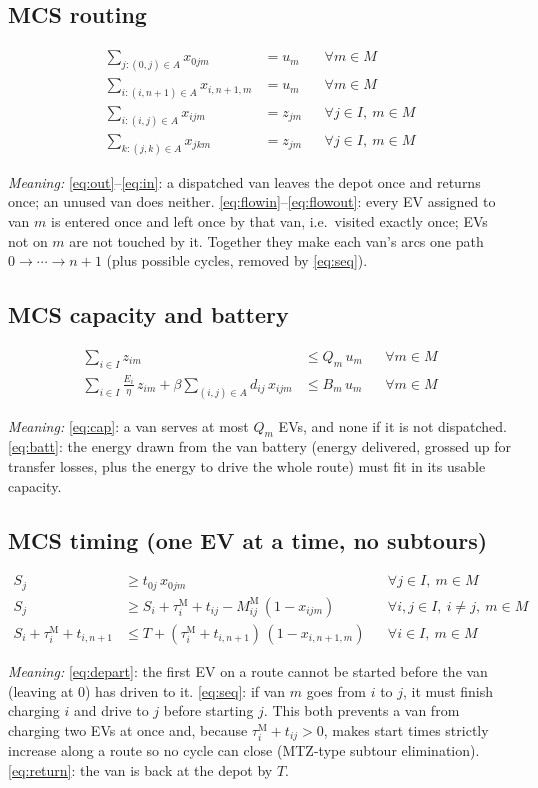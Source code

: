 \documentclass[12pt,a4paper]{article}
\newcommand{\mdesc}[1]{\par{\textit{Meaning:} #1}\par}
\begin{document}
\subsection{MCS routing}
\begin{align}
\sum_{j:(0,j)\in A}x_{0jm} &= u_m && \forall m\in M \label{eq:out}\\
\sum_{i:(i,n+1)\in A}x_{i,n+1,m} &= u_m && \forall m\in M \label{eq:in}\\
\sum_{i:(i,j)\in A}x_{ijm} &= z_{jm} && \forall j\in I,\ m\in M \label{eq:flowin}\\
\sum_{k:(j,k)\in A}x_{jkm} &= z_{jm} && \forall j\in I,\ m\in M \label{eq:flowout}
\end{align}
\mdesc{\eqref{eq:out}--\eqref{eq:in}: a dispatched van leaves the depot once and returns once; an unused van does neither. \eqref{eq:flowin}--\eqref{eq:flowout}: every EV assigned to van $m$ is entered once and left once by that van, i.e.\ visited exactly once; EVs not on $m$ are not touched by it. Together they make each van's arcs one path $0\to\cdots\to n+1$ (plus possible cycles, removed by \eqref{eq:seq}).}

\subsection{MCS capacity and battery}
\begin{align}
\sum_{i\in I}z_{im} &\le Q_m\,u_m && \forall m\in M \label{eq:cap}\\
\sum_{i\in I}\frac{E_i}{\eta}\,z_{im}+\beta\sum_{(i,j)\in A}d_{ij}\,x_{ijm} &\le B_m\,u_m && \forall m\in M \label{eq:batt}
\end{align}
\mdesc{\eqref{eq:cap}: a van serves at most $Q_m$ EVs, and none if it is not dispatched. \eqref{eq:batt}: the energy drawn from the van battery (energy delivered, grossed up for transfer losses, plus the energy to drive the whole route) must fit in its usable capacity.}

\subsection{MCS timing (one EV at a time, no subtours)}
\begin{align}
S_j &\ge t_{0j}\,x_{0jm} && \forall j\in I,\ m\in M \label{eq:depart}\\
S_j &\ge S_i+\tau^{\mathrm M}_i+t_{ij}-M^{\mathrm M}_{ij}\,(1-x_{ijm}) && \forall i,j\in I,\ i\ne j,\ m\in M \label{eq:seq}\\
S_i+\tau^{\mathrm M}_i+t_{i,n+1} &\le T+(\tau^{\mathrm M}_i+t_{i,n+1})\,(1-x_{i,n+1,m}) && \forall i\in I,\ m\in M \label{eq:return}
\end{align}
\mdesc{\eqref{eq:depart}: the first EV on a route cannot be started before the van (leaving at 0) has driven to it. \eqref{eq:seq}: if van $m$ goes from $i$ to $j$, it must finish charging $i$ and drive to $j$ before starting $j$. This both prevents a van from charging two EVs at once and, because $\tau^{\mathrm M}_i+t_{ij}>0$, makes start times strictly increase along a route so no cycle can close (MTZ-type subtour elimination). \eqref{eq:return}: the van is back at the depot by $T$.}
\end{document}
